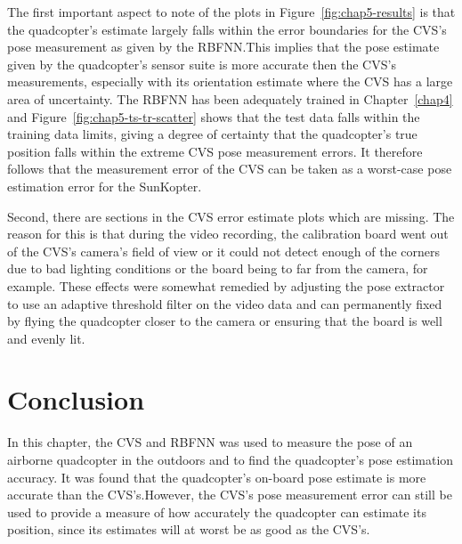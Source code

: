 The first important aspect to note of the plots in Figure~\ref{fig:chap5-results} is that the quadcopter's estimate largely falls within the error boundaries for the CVS's pose measurement as given by the RBFNN.\@ This implies that the pose estimate given by the quadcopter's sensor suite is more accurate then the CVS's measurements, especially with its orientation estimate where the CVS has a large area of uncertainty. The RBFNN has been adequately trained in Chapter~\ref{chap4} and Figure~\ref{fig:chap5-ts-tr-scatter} shows that the test data falls within the training data limits, giving a degree of certainty that the quadcopter's true position falls within the extreme CVS pose measurement errors. It therefore follows that the measurement error of the CVS can be taken as a worst-case pose estimation error for the SunKopter. 

Second, there are sections in the CVS error estimate plots which are missing. The reason for this is that during the video recording, the calibration board went out of the CVS's camera's field of view or it could not detect enough of the corners due to bad lighting conditions or the board being to far from the camera, for example. These effects were somewhat remedied by adjusting the pose extractor to use an adaptive threshold filter on the video data and can permanently fixed by flying the quadcopter closer to the camera or ensuring that the board is well and evenly lit. 

\section{Conclusion}

In this chapter, the CVS and RBFNN was used to measure the pose of an airborne quadcopter in the outdoors and to find the quadcopter's pose estimation accuracy. It was found that the quadcopter's on-board pose estimate is more accurate than the CVS's.\@ However, the CVS's pose measurement error can still be used to provide a measure of how accurately the quadcopter can estimate its position, since its estimates will at worst be as good as the CVS's.\@ 
